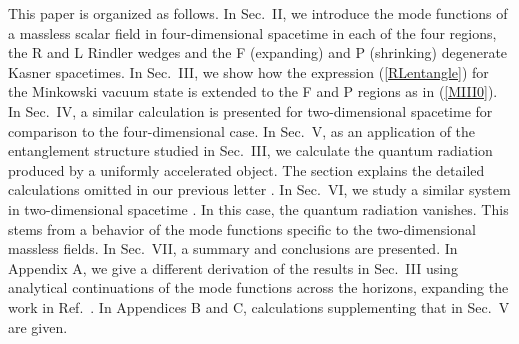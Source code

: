 \documentclass[aps,prd,preprintnumbers,nofootinbib,showpacs,11pt]{revtex4}%
\begin{document}
\begin{widetext}
This paper is organized as follows. In Sec.~II, we introduce the mode functions
of a massless scalar field in four-dimensional spacetime in each of the four 
regions, the R and L Rindler wedges and the F (expanding) and 
P (shrinking) degenerate Kasner spacetimes. 
In Sec.~III, we show how the expression (\ref{RLentangle}) for the Minkowski vacuum state
is extended to the F and P regions as in (\ref{MIII0}).
In Sec.~IV, a similar calculation is presented for two-dimensional spacetime 
for comparison to the four-dimensional case.
In Sec.~V, as an application of the entanglement structure studied in Sec.~III, 
we calculate the quantum radiation produced by a uniformly accelerated object.
The section explains the detailed calculations omitted in our 
previous letter \cite{ITUY}. 
In Sec.~VI, we study a similar system in two-dimensional spacetime \cite{HuRaval}.
In this case, the quantum radiation vanishes. This stems from a behavior of the mode functions
specific to the two-dimensional massless fields.
In Sec.~VII, a summary and conclusions are presented. 
In Appendix A, we give a different derivation of the results in Sec.~III
using analytical continuations of the mode functions across the horizons, expanding the work in 
Ref.~\cite{Sommerfield}. 
In Appendices B and C, calculations supplementing that in Sec.~V are given.


\end{widetext}
\end{document}
